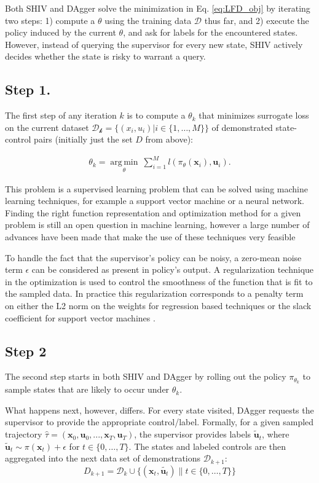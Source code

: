 \documentclass[10pt, conference]{ieeeconf}      %
\DeclareMathOperator*{\argmin}{arg\,min}
\newcommand{\bu}{\mathbf{u}}
\newcommand{\bx}{\mathbf{x}}
\newcommand{\fpnote}[1]{\ifthenelse{\boolean{include-notes}}%
 {\textcolor{blue}{\textbf{FP: #1}}}{}}
\begin{document}
Both SHIV and DAgger \cite{ross2010reduction} solve the minimization in Eq. \ref{eq:LFD_obj} by iterating two steps: 1) compute a $\theta$ using the training data $\mathcal{D}$ thus far, and 2) execute the policy induced by the current $\theta$, and ask for labels for the encountered states. However, instead of querying the supervisor for every new state, SHIV actively decides whether the state is risky to warrant a query. 


\subsection{Step 1.}
The first step of any iteration $k$ is to compute a $\theta_k$ that minimizes surrogate loss on the current dataset $\mathcal{D_k}=\{(x_i,u_i)|i\in\{1,\ldots,M\}\}$ of demonstrated state-control pairs (initially just the set $D$ from above):


 \vspace{-2ex}
\begin{align}\label{eq:super_objj}
\theta_{k} = \underset{\theta}{\argmin} \: \sum_{i=1}^{M} l(\pi_{\theta}(\bx_i),\bu_i).
\end{align}


This problem is a supervised learning problem that can be solved using machine learning techniques, for example a support vector machine or a neural network. Finding the right function representation and optimization method for a given problem is still an open question in machine learning, however a large number of advances have been made that make the use of these techniques very feasible \cite{scholkopf2002learning}
 
To handle the fact that the supervisor's policy can be noisy, a zero-mean noise term $\epsilon$ 
can be considered as present in policy's output.  A regularization technique in the optimization is
used to control the smoothness of the function that is fit to the sampled data. In practice this regularization corresponds to a penalty term on either the L2 norm on the weights for regression based techniques or the slack coefficient for support vector machines \cite{scholkopf2002learning}.
 \subsection{Step 2}
The second step starts in both SHIV and DAgger by rolling out the policy $\pi_{\theta_{k}}$ to sample states that are likely to occur under $\theta_{k}$. 

What happens next, however, differs. For every state visited, DAgger requests the supervisor to provide the appropriate control/label. Formally, for a given sampled trajectory  $\hat{\tau} = (\bx_0,\bu_0,...,\bx_T,\bu_T )$, the supervisor provides labels $\tilde{\bu}_t$, where $\tilde{\bu}_t \sim \pi(\bx_t) + \epsilon$ for $t\in \{0, \ldots, T\}$.
The states and labeled controls are then aggregated into the next data set of demonstrations $\mathcal{D}_{k+1}$:
$$D_{k+1}=\mathcal{D}_k \cup \{(\bx_t,\tilde{\bu_t})\|t\in\{0,\ldots,T\}\} $$
\end{document}
